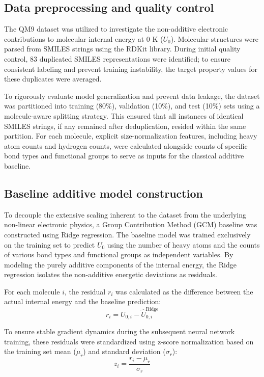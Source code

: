 \documentclass[]{article}
\begin{document}
\subsection{Data preprocessing and quality control}
The QM9 dataset was utilized to investigate the non-additive electronic contributions to molecular internal energy at 0 K ($U_0$). Molecular structures were parsed from SMILES strings using the RDKit library. During initial quality control, 83 duplicated SMILES representations were identified; to ensure consistent labeling and prevent training instability, the target property values for these duplicates were averaged. 

To rigorously evaluate model generalization and prevent data leakage, the dataset was partitioned into training (80\%), validation (10\%), and test (10\%) sets using a molecule-aware splitting strategy. This ensured that all instances of identical SMILES strings, if any remained after deduplication, resided within the same partition. For each molecule, explicit size-normalization features, including heavy atom counts and hydrogen counts, were calculated alongside counts of specific bond types and functional groups to serve as inputs for the classical additive baseline.

\subsection{Baseline additive model construction}
To decouple the extensive scaling inherent to the dataset from the underlying non-linear electronic physics, a Group Contribution Method (GCM) baseline was constructed using Ridge regression. The baseline model was trained exclusively on the training set to predict $U_0$ using the number of heavy atoms and the counts of various bond types and functional groups as independent variables. By modeling the purely additive components of the internal energy, the Ridge regression isolates the non-additive energetic deviations as residuals. 

For each molecule $i$, the residual $r_i$ was calculated as the difference between the actual internal energy and the baseline prediction:
\begin{equation}    r_i = U_{0,i} - \hat{U}_{0,i}^{\text{Ridge}}\end{equation}

To ensure stable gradient dynamics during the subsequent neural network training, these residuals were standardized using z-score normalization based on the training set mean ($\mu_r$) and standard deviation ($\sigma_r$):
\begin{equation}    z_i = \frac{r_i - \mu_r}{\sigma_r} \end{equation} \citep{yun2024znormzscoregradientnormalization}
\end{document}
